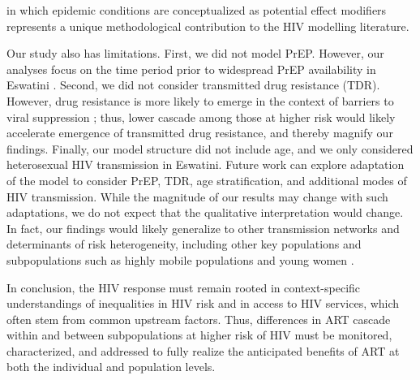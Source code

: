 in which epidemic conditions are conceptualized as potential effect modifiers
represents a unique methodological contribution to the HIV modelling literature.
\par
Our study also has limitations.
First, we did not model PrEP.
However, our analyses focus on the time period
prior to widespread PrEP availability in Eswatini \cite{EswIBBS2022}.
Second, we did not consider transmitted drug resistance (TDR).
However, drug resistance is more likely to emerge
in the context of barriers to viral suppression \cite{Pham2014};
thus, lower cascade among those at higher risk
would likely accelerate emergence of transmitted drug resistance,
and thereby magnify our findings.
Finally, our model structure did not include age,
and we only considered heterosexual HIV transmission in Eswatini.
Future work can explore adaptation of the model to consider
PrEP, TDR, age stratification, and additional modes of HIV transmission.
While the magnitude of our results may change with such adaptations,
we do not expect that the qualitative interpretation would change.
In fact, our findings would likely generalize
to other transmission networks and determinants of risk heterogeneity,
including other key populations and subpopulations such as
highly mobile populations and young women \cite{Camlin2019,Cheuk2020}.
\par
In conclusion, the HIV response must remain rooted in
context-specific understandings of inequalities in HIV risk and in access to HIV services,
which often stem from common upstream factors.
Thus, differences in ART cascade within and between subpopulations at higher risk of HIV
must be monitored, characterized, and addressed
to fully realize the anticipated benefits of ART
at both the individual and population levels.
